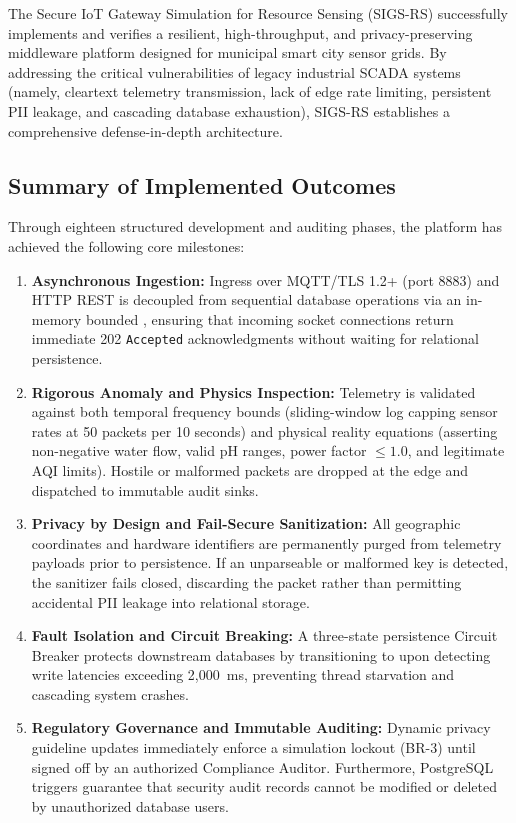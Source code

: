 \documentclass[a4paper]{article}
\begin{document}
The Secure IoT Gateway Simulation for Resource Sensing (SIGS-RS) successfully implements and verifies a resilient, high-throughput, and privacy-preserving middleware platform designed for municipal smart city sensor grids. By addressing the critical vulnerabilities of legacy industrial SCADA systems (namely, cleartext telemetry transmission, lack of edge rate limiting, persistent PII leakage, and cascading database exhaustion), SIGS-RS establishes a comprehensive defense-in-depth architecture.

\subsection{Summary of Implemented Outcomes}
Through eighteen structured development and auditing phases, the platform has achieved the following core milestones:
\begin{enumerate}
    \item \textbf{Asynchronous Ingestion:} Ingress over MQTT/TLS 1.2+ (port 8883) and HTTP REST is decoupled from sequential database operations via an in-memory bounded , ensuring that incoming socket connections return immediate 202 \texttt{Accepted} acknowledgments without waiting for relational persistence.
    \item \textbf{Rigorous Anomaly and Physics Inspection:} Telemetry is validated against both temporal frequency bounds (sliding-window log capping sensor rates at 50 packets per 10 seconds) and physical reality equations (asserting non-negative water flow, valid pH ranges, power factor $\le 1.0$, and legitimate AQI limits). Hostile or malformed packets are dropped at the edge and dispatched to immutable audit sinks.
    \item \textbf{Privacy by Design and Fail-Secure Sanitization:} All geographic coordinates and hardware identifiers are permanently purged from telemetry payloads prior to persistence. If an unparseable or malformed key is detected, the sanitizer fails closed, discarding the packet rather than permitting accidental PII leakage into relational storage.
    \item \textbf{Fault Isolation and Circuit Breaking:} A three-state persistence Circuit Breaker protects downstream databases by transitioning to  upon detecting write latencies exceeding 2,000~ms, preventing thread starvation and cascading system crashes.
    \item \textbf{Regulatory Governance and Immutable Auditing:} Dynamic privacy guideline updates immediately enforce a simulation lockout (BR-3) until signed off by an authorized Compliance Auditor. Furthermore, PostgreSQL triggers guarantee that security audit records cannot be modified or deleted by unauthorized database users.
\end{enumerate}
\end{document}
